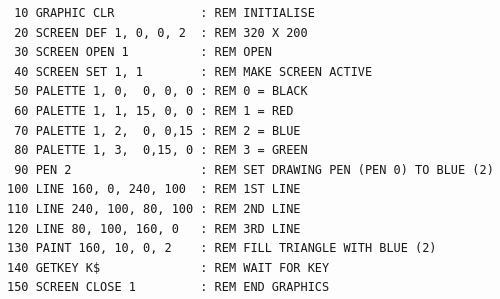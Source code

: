 \begin{description}[leftmargin=2cm,style=nextline]
\begin{tcolorbox}[colback=black,coltext=white]
\verbatimfont{\codefont}
\begin{verbatim}
 10 GRAPHIC CLR            : REM INITIALISE
 20 SCREEN DEF 1, 0, 0, 2  : REM 320 X 200
 30 SCREEN OPEN 1          : REM OPEN
 40 SCREEN SET 1, 1        : REM MAKE SCREEN ACTIVE
 50 PALETTE 1, 0,  0, 0, 0 : REM 0 = BLACK
 60 PALETTE 1, 1, 15, 0, 0 : REM 1 = RED
 70 PALETTE 1, 2,  0, 0,15 : REM 2 = BLUE
 80 PALETTE 1, 3,  0,15, 0 : REM 3 = GREEN
 90 PEN 2                  : REM SET DRAWING PEN (PEN 0) TO BLUE (2)
100 LINE 160, 0, 240, 100  : REM 1ST LINE
110 LINE 240, 100, 80, 100 : REM 2ND LINE
120 LINE 80, 100, 160, 0   : REM 3RD LINE
130 PAINT 160, 10, 0, 2    : REM FILL TRIANGLE WITH BLUE (2)
140 GETKEY K$              : REM WAIT FOR KEY
150 SCREEN CLOSE 1         : REM END GRAPHICS
\end{verbatim}
\end{tcolorbox}
\end{description}


\newpage
